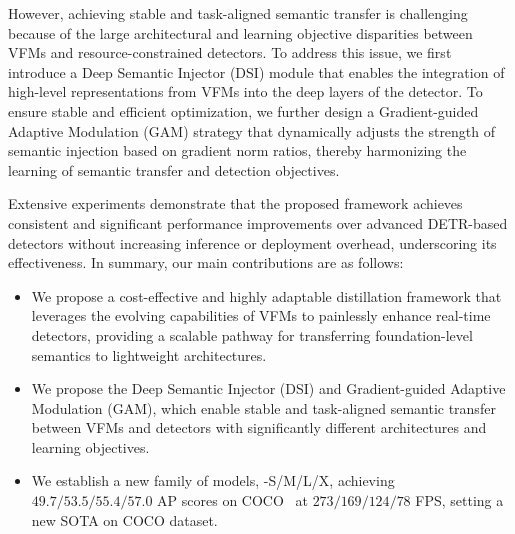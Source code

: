 However, achieving stable and task-aligned semantic transfer is challenging because of the large architectural and learning objective disparities between VFMs and resource-constrained detectors.
To address this issue, we first introduce a Deep Semantic Injector (DSI) module that enables the integration of high-level representations from VFMs into the deep layers of the detector.
To ensure stable and efficient optimization, we further design a Gradient-guided Adaptive Modulation (GAM) strategy that dynamically adjusts the strength of semantic injection based on gradient norm ratios, thereby harmonizing the learning of semantic transfer and detection objectives.

Extensive experiments demonstrate that the proposed framework achieves consistent and significant performance improvements over advanced DETR-based detectors without increasing inference or deployment overhead, underscoring its effectiveness.
In summary, our main contributions are as follows:
\begin{itemize}
\item We propose a cost-effective and highly adaptable distillation framework that leverages the evolving capabilities of VFMs to painlessly enhance real-time detectors, providing a scalable pathway for transferring foundation-level semantics to lightweight architectures.
\item We propose the Deep Semantic Injector (DSI) and Gradient-guided Adaptive Modulation (GAM), which enable stable and task-aligned semantic transfer between VFMs and detectors with significantly different architectures and learning objectives.
\item We establish a new family of models, \ourmethod-S/M/L/X, achieving $49.7 / 53.5 / 55.4 / 57.0$ AP scores on COCO~\cite{lin2014microsoft} at $273 / 169 / 124 / 78$ FPS, setting a new SOTA on COCO dataset.
\end{itemize}